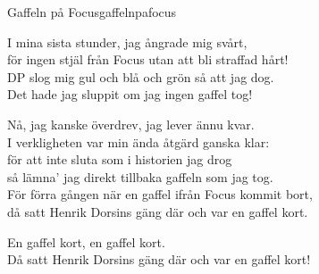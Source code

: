 \begin{song}{Gaffeln på Focus}{gaffelnpafocus}
\begin{vers}
I mina sista stunder, jag ångrade mig svårt,\\
för ingen stjäl från Focus utan att bli straffad hårt!\\
DP slog mig gul och blå och grön så att jag dog.\\
Det hade jag sluppit om jag ingen gaffel tog!\\
\end{vers}

\begin{vers}
Nå, jag kanske överdrev, jag lever ännu kvar.\\
I verkligheten var min ända åtgärd ganska klar:\\
för att inte sluta som i historien jag drog\\
så lämna' jag direkt tillbaka gaffeln som jag tog.\\
För förra gången när en gaffel ifrån Focus kommit bort,\\
då satt Henrik Dorsins gäng där och var en gaffel kort.\\
\end{vers}

\begin{vers}
En gaffel kort, en gaffel kort.\\
Då satt Henrik Dorsins gäng där och var en gaffel kort!\\
\end{vers}

\end{song}